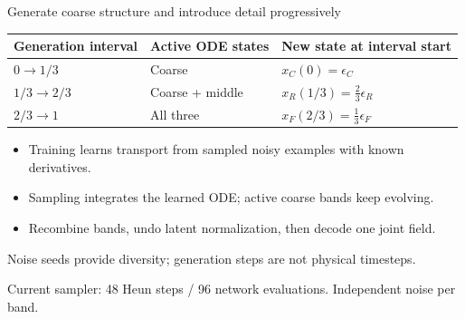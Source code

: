 \documentclass[aspectratio=169,11pt]{beamer}
\newcommand{\keypoint}[1]{\begin{block}{}#1\end{block}}
\newcommand{\smallsource}[1]{\vfill{\tiny\color{muted}#1}}
\begin{document}
\begin{frame}{Generate coarse structure and introduce detail progressively}
  \small
  \begin{tabularx}{\linewidth}{lYY}
    \toprule
    Generation interval & Active ODE states & New state at interval start \\
    \midrule
    $0\to1/3$ & Coarse & $x_C(0)=\epsilon_C$ \\
    $1/3\to2/3$ & Coarse + middle & $x_R(1/3)=\tfrac23\epsilon_R$ \\
    $2/3\to1$ & All three & $x_F(2/3)=\tfrac13\epsilon_F$ \\
    \bottomrule
  \end{tabularx}
  \medskip
  \begin{itemize}
    \item Training learns transport from sampled noisy examples with known derivatives.
    \item Sampling integrates the learned ODE; active coarse bands keep evolving.
    \item Recombine bands, undo latent normalization, then decode one joint field.
  \end{itemize}
  \keypoint{Noise seeds provide diversity; generation steps are not physical timesteps.}
  \smallsource{Current sampler: 48 Heun steps / 96 network evaluations. Independent noise per band.}
\end{frame}
\end{document}
